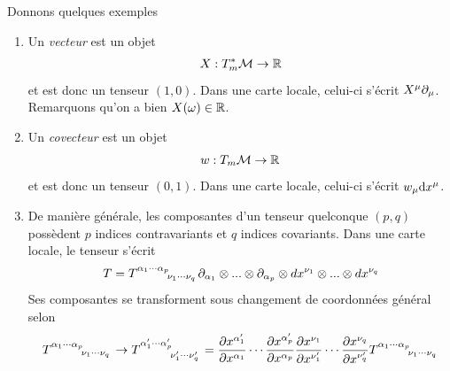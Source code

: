 \begin{exmp} Donnons quelques exemples\\
    \begin{enumerate}
        \item Un \emph{vecteur} est un objet 
        \begin{equation}
            X:T_m^*\mathcal{M} \to \mathbb{R}
        \end{equation}
        et est donc un tenseur $(1,0)$. Dans une carte locale, celui-ci s'écrit $X^\mu \partial_\mu$. Remarquons qu'on a bien $X(\omega) \in \mathbb{R}$.
        \item Un \emph{covecteur} est un objet 
        \begin{equation}
            w:T_m\mathcal{M} \to \mathbb{R}
        \end{equation}
        et est donc un tenseur $(0,1)$. Dans une carte locale, celui-ci s'écrit $w_\mu \mathrm{d} x^\mu$.
        \item De manière générale, les composantes d'un tenseur quelconque $(p,q)$ possèdent $p$ indices contravariants et $q$ indices covariants. Dans une carte locale, le tenseur s'écrit
        \begin{equation}
            T = T\indices{^{\alpha_1} ^{\cdots}^{\alpha_p}_{\nu_1}_{\cdots} _{\nu_q}} \partial_{\alpha_{1}}
            \otimes ... \otimes \partial_{\alpha_{p}} \otimes dx^{\nu_{1}}\otimes...\otimes dx^{\nu_{q}} 
        \end{equation}
        Ses composantes se transforment sous changement de coordonnées général selon
        \begin{equation}
            T\indices{^{\alpha_1} ^{\cdots}^{\alpha_p}_{\nu_1}_{\cdots} _{\nu_q}} \to T\indices{^{\alpha'_1} ^{\cdots}^{\alpha'_p}_{\nu'_1}_{\cdots} _{\nu'_q}} = \frac{\partial x^{\alpha'_1}}{\partial x^{\alpha_1}} \cdots\frac{\partial x^{\alpha'_p}}{\partial x^{\alpha_p}}\frac{\partial x^{\nu_1}}{\partial x^{\nu'_1}}\cdots\frac{\partial x^{\nu_q}}{\partial x^{\nu'_q}} T\indices{^{\alpha_1} ^{\cdots}^{\alpha_p}_{\nu_1}_{\cdots} _{\nu_q}}
        \end{equation}
    \end{enumerate}
\end{exmp}
